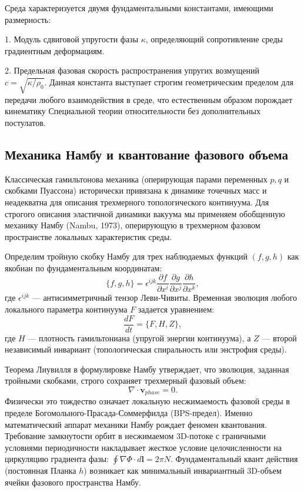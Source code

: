 \documentclass[12pt,a4paper]{article}
\begin{document}
Среда характеризуется двумя фундаментальными константами, имеющими размерность:

1. Модуль сдвиговой упругости фазы $\kappa$, определяющий сопротивление среды градиентным деформациям.

2. Предельная фазовая скорость распространения упругих возмущений $c = \sqrt{\kappa / \rho_0}$. Данная константа выступает строгим геометрическим пределом для передачи любого взаимодействия в среде, что естественным образом порождает кинематику Специальной теории относительности без дополнительных постулатов.

	\subsection{Механика Намбу и квантование фазового объема}
Классическая гамильтонова механика (оперирующая парами переменных $p, q$ и скобками Пуассона) исторически привязана к динамике точечных масс и неадекватна для описания трехмерного топологического континуума. Для строгого описания эластичной динамики вакуума мы применяем обобщенную механику Намбу (Nambu, 1973), оперирующую в трехмерном фазовом пространстве локальных характеристик среды.

Определим тройную скобку Намбу для трех наблюдаемых функций $(f, g, h)$ как якобиан по фундаментальным координатам:
	\begin{equation}
	\{f, g, h\} = \epsilon^{ijk} \frac{\partial f}{\partial x^i} \frac{\partial g}{\partial x^j} \frac{\partial h}{\partial x^k},
	\end{equation}
где $\epsilon^{ijk}$ — антисимметричный тензор Леви-Чивиты.
Временная эволюция любого локального параметра континуума $F$ задается уравнением:
	\begin{equation}
	\frac{dF}{dt} = \{F, H, Z\},
	\end{equation}
где $H$ — плотность гамильтониана (упругой энергии континуума), а $Z$ — второй независимый инвариант (топологическая спиральность или энстрофия среды). 

Теорема Лиувилля в формулировке Намбу утверждает, что эволюция, заданная тройными скобками, строго сохраняет трехмерный фазовый объем:
	\begin{equation}
	\nabla \cdot \mathbf{v}_{phase} = 0.
	\end{equation}
Физически это тождество означает локальную несжимаемость фазовой среды в пределе Богомольного-Прасада-Соммерфилда (BPS-предел). 
Именно математический аппарат механики Намбу рождает феномен квантования. Требование замкнутости орбит в несжимаемом 3D-потоке с граничными условиями периодичности накладывает жесткое условие целочисленности на циркуляцию градиента фазы: $\oint \nabla \Phi \cdot d\mathbf{l} = 2\pi N$. Фундаментальный квант действия (постоянная Планка $h$) возникает как минимальный инвариантный 3D-объем ячейки фазового пространства Намбу.
\end{document}
